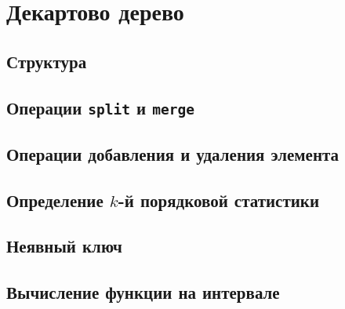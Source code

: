 \documentclass[a4paper,12pt]{article}
\begin{document}
  \section{Декартово дерево}

    \subsection{Структура}

    \subsection{Операции \texttt{split} и \texttt{merge}}

    \subsection{Операции добавления и удаления элемента}

    \subsection{Определение $k$-й порядковой статистики}

    \subsection{Неявный ключ}

    \subsection{Вычисление функции на интервале}
\end{document}
